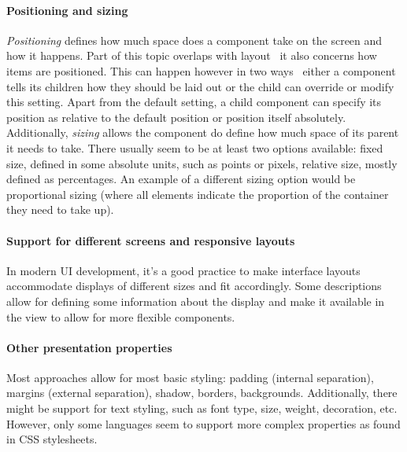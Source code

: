 \paragraph{Positioning and sizing}
\emph{Positioning} defines how much space does a component take on the screen and how it happens.
Part of this topic overlaps with layout \textendash\ it also concerns how items are positioned.
This can happen however in two ways \textendash\ either a component tells its children how they should be laid out or the child can override or modify this setting.
Apart from the default setting, a child component can specify its position as relative to the default position or position itself absolutely.
Additionally, \emph{sizing} allows the component do define how much space of its parent it needs to take.
There usually seem to be at least two options available: fixed size, defined in some absolute units, such as points or pixels, relative size, mostly defined as percentages.
An example of a different sizing option would be proportional sizing (where all elements indicate the proportion of the container they need to take up).

\paragraph{Support for different screens and responsive layouts}
In modern UI development, it's a good practice to make interface layouts accommodate displays of different sizes and fit accordingly.
Some descriptions allow for defining some information about the display and make it available in the view to allow for more flexible components.

\paragraph{Other presentation properties}

Most approaches allow for most basic styling: padding (internal separation), margins (external separation), shadow, borders, backgrounds.
Additionally, there might be support for text styling, such as font type, size, weight, decoration, etc.
However, only some languages seem to support more complex properties as found in CSS stylesheets.
